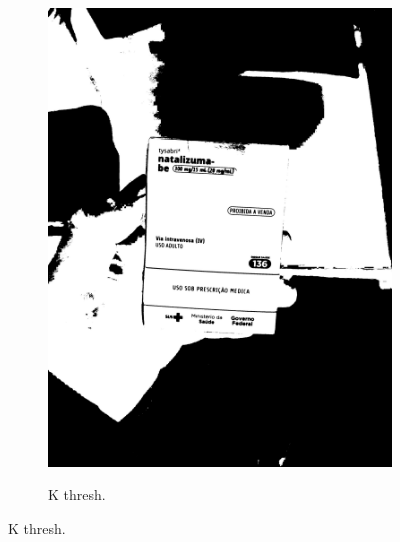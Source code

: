 \begin{figure}[htb]
\begin{subfigure}[t]{0.21\textwidth}
        \includegraphics[width=\linewidth]{../pictures/tysabri_cmyk_y_only_thresh.jpg}
    \end{subfigure}
    \hfill
    \begin{subfigure}[t]{0.21\textwidth}
        \centering
        \caption{K thresh.}
        \label{fig:foto:versoes:2:K_thresh}

\end{subfigure}
\end{figure}
